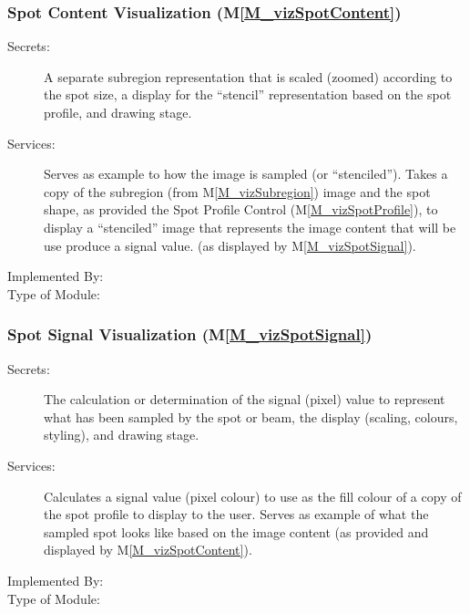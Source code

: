 \documentclass[12pt, titlepage]{article}
\newcommand{\mref}[1]{M\ref{#1}}
\begin{document}
\subsubsection{Spot Content Visualization (\mref{M_vizSpotContent})}
\begin{description}
\item[Secrets:]A separate subregion representation that is scaled (zoomed) according to
  the spot size, a display for the ``stencil'' representation based on the spot profile,
  and drawing stage.
\item[Services:]Serves as example to how the image is sampled (or ``stenciled'').
  Takes a copy of the subregion (from \mref{M_vizSubregion}) image and the spot shape, 
  as provided the Spot Profile Control (\mref{M_vizSpotProfile}), to display a ``stenciled'' image
  that represents the image content that will be use produce a signal value.
  (as displayed by \mref{M_vizSpotSignal}).
\item[Implemented By:] \progname{}
\item[Type of Module:] 
\end{description}


\subsubsection{Spot Signal Visualization (\mref{M_vizSpotSignal})}
\begin{description}
\item[Secrets:]The calculation or determination of the signal (pixel) value to represent
  what has been sampled by the spot or beam, the display (scaling, colours, styling),
  and drawing stage.
\item[Services:]Calculates a signal value (pixel colour) to use as the fill colour
  of a copy of the spot profile to display to the user.
  Serves as example of what the sampled spot looks like based on the image content
  (as provided and displayed by \mref{M_vizSpotContent}).
\item[Implemented By:] \progname{}
\item[Type of Module:] 
\end{description}
\end{document}
